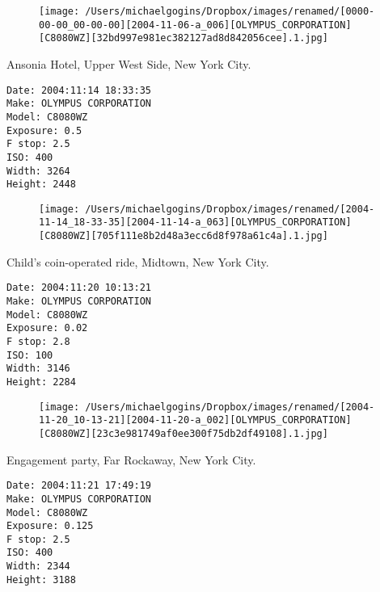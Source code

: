 \documentclass[11pt,letter,DIV=14,paper=landscape]{scrbook}
\begin{document}
\begin{figure}
\texttt{[image: /Users/michaelgogins/Dropbox/images/renamed/[0000-00-00\_00-00-00][2004-11-06-a\_006][OLYMPUS\_CORPORATION][C8080WZ][32bd997e981ec382127ad8d842056cee].1.jpg]}
\end{figure}
    
\clearpage
\noindent Ansonia Hotel, Upper West Side, New York City.
\noindent
\begin{lstlisting}
Date: 2004:11:14 18:33:35
Make: OLYMPUS CORPORATION
Model: C8080WZ
Exposure: 0.5
F stop: 2.5
ISO: 400
Width: 3264
Height: 2448
\end{lstlisting}
\clearpage

\begin{figure}
\texttt{[image: /Users/michaelgogins/Dropbox/images/renamed/[2004-11-14\_18-33-35][2004-11-14-a\_063][OLYMPUS\_CORPORATION][C8080WZ][705f111e8b2d48a3ecc6d8f978a61c4a].1.jpg]}
\end{figure}
    
\clearpage
\noindent Child's coin-operated ride, Midtown, New York City.
\noindent
\begin{lstlisting}
Date: 2004:11:20 10:13:21
Make: OLYMPUS CORPORATION
Model: C8080WZ
Exposure: 0.02
F stop: 2.8
ISO: 100
Width: 3146
Height: 2284
\end{lstlisting}
\clearpage

\begin{figure}
\texttt{[image: /Users/michaelgogins/Dropbox/images/renamed/[2004-11-20\_10-13-21][2004-11-20-a\_002][OLYMPUS\_CORPORATION][C8080WZ][23c3e981749af0ee300f75db2df49108].1.jpg]}
\end{figure}
    
\clearpage
\noindent Engagement party, Far Rockaway, New York City.
\noindent
\begin{lstlisting}
Date: 2004:11:21 17:49:19
Make: OLYMPUS CORPORATION
Model: C8080WZ
Exposure: 0.125
F stop: 2.5
ISO: 400
Width: 2344
Height: 3188
\end{lstlisting}
\clearpage
\end{document}
